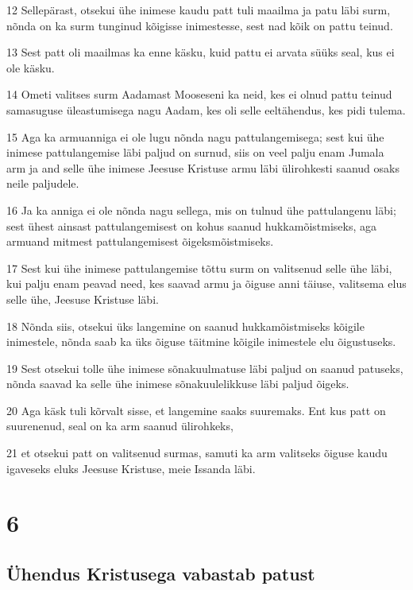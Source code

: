 \par 12 Sellepärast, otsekui ühe inimese kaudu patt tuli maailma ja patu läbi surm, nõnda on ka surm tunginud kõigisse inimestesse, sest nad kõik on pattu teinud.
\par 13 Sest patt oli maailmas ka enne käsku, kuid pattu ei arvata süüks seal, kus ei ole käsku.
\par 14 Ometi valitses surm Aadamast Mooseseni ka neid, kes ei olnud pattu teinud samasuguse üleastumisega nagu Aadam, kes oli selle eeltähendus, kes pidi tulema.
\par 15 Aga ka armuanniga ei ole lugu nõnda nagu pattulangemisega; sest kui ühe inimese pattulangemise läbi paljud on surnud, siis on veel palju enam Jumala arm ja and selle ühe inimese Jeesuse Kristuse armu läbi ülirohkesti saanud osaks neile paljudele.
\par 16 Ja ka anniga ei ole nõnda nagu sellega, mis on tulnud ühe pattulangenu läbi; sest ühest ainsast pattulangemisest on kohus saanud hukkamõistmiseks, aga armuand mitmest pattulangemisest õigeksmõistmiseks.
\par 17 Sest kui ühe inimese pattulangemise tõttu surm on valitsenud selle ühe läbi, kui palju enam peavad need, kes saavad armu ja õiguse anni täiuse, valitsema elus selle ühe, Jeesuse Kristuse läbi.
\par 18 Nõnda siis, otsekui üks langemine on saanud hukkamõistmiseks kõigile inimestele, nõnda saab ka üks õiguse täitmine kõigile inimestele elu õigustuseks.
\par 19 Sest otsekui tolle ühe inimese sõnakuulmatuse läbi paljud on saanud patuseks, nõnda saavad ka selle ühe inimese sõnakuulelikkuse läbi paljud õigeks.
\par 20 Aga käsk tuli kõrvalt sisse, et langemine saaks suuremaks. Ent kus patt on suurenenud, seal on ka arm saanud ülirohkeks,
\par 21 et otsekui patt on valitsenud surmas, samuti ka arm valitseks õiguse kaudu igaveseks eluks Jeesuse Kristuse, meie Issanda läbi.


\chapter{6}

\section*{Ühendus Kristusega vabastab patust}

